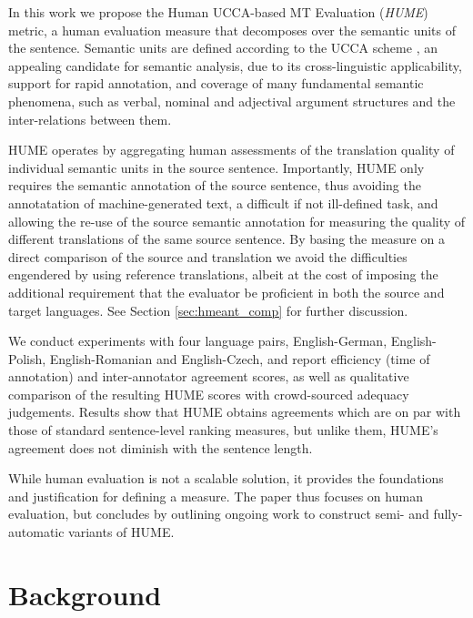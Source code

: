 \documentclass[11pt]{article}
\newcommand{\secref}[1]{Section \ref{#1}}
\begin{document}
In this work we propose the Human UCCA-based MT Evaluation ({\it HUME}) metric,
a human evaluation measure that decomposes over the semantic units of the sentence.
Semantic units are defined according to the 
UCCA scheme \cite{abend2013universal}, an appealing candidate for semantic analysis,
due to its cross-linguistic applicability, support for rapid annotation, and coverage
of many fundamental semantic phenomena, such as verbal, nominal and adjectival
argument structures and the inter-relations between them.

HUME operates by aggregating human assessments of the translation quality of individual
semantic units in the source sentence.
Importantly, HUME only requires the semantic annotation of the source sentence, thus avoiding the 
annotatation of machine-generated text, a difficult if not ill-defined task, and allowing the re-use
of the source semantic annotation for measuring the quality of different translations of the same source sentence.
By basing the measure on a direct comparison
of the source and translation we avoid the difficulties engendered by using
reference translations, albeit at the cost of imposing the additional requirement
that the evaluator be proficient in both the source and target languages.
See \secref{sec:hmeant_comp} for further discussion.

We conduct experiments with four language pairs, English-German, English-Polish,
English-Romanian and English-Czech, and report efficiency (time of annotation) and
inter-annotator agreement scores, as well as qualitative comparison of the resulting
HUME scores with crowd-sourced adequacy judgements. Results show that HUME obtains 
agreements which are on par with those of standard sentence-level ranking measures,
but unlike them, HUME's agreement does not diminish with the sentence length.

While human evaluation is not a scalable solution,
it provides the foundations and justification for defining a measure.
The paper thus focuses on human evaluation, but concludes
by outlining ongoing work to construct semi- and fully-automatic variants of HUME.


\section{Background}\label{sec:background}

\end{document}

